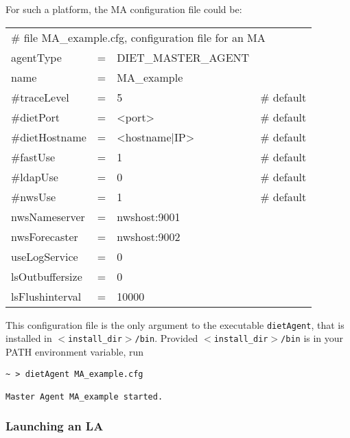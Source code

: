 For such a platform, the MA configuration file could be:
\tt
\begin{center}
 \footnotesize
 \begin{tabular}{lcll}
  \multicolumn{4}{l}{\# file MA\_example.cfg, configuration file for an MA}\\
  agentType     &=&DIET\_MASTER\_AGENT&\\
  name          &=&MA\_example        &\\
  \#traceLevel  &=&5                  &\# default\\
  \#dietPort    &=&<port>             &\# default\\
  \#dietHostname&=&<hostname|IP>      &\# default\\
  \#fastUse     &=&1                  &\# default\\
  \#ldapUse     &=&0                  &\# default\\
  \#nwsUse      &=&1                  &\# default\\
  nwsNameserver &=&nwshost:9001       &\\
  nwsForecaster &=&nwshost:9002       &\\
  useLogService &=& 0                 &\\
  lsOutbuffersize &=& 0               &\\
  lsFlushinterval &=& 10000           &\\
 \end{tabular}
\end{center}
\rm

This configuration file is the only argument to the executable \texttt{dietAgent},
that is installed in \texttt{$<$install\_dir$>$/bin}. Provided
\texttt{$<$install\_dir$>$/bin} is in your PATH environment variable, run
{\footnotesize
\begin{verbatim}
~ > dietAgent MA_example.cfg

Master Agent MA_example started.
\end{verbatim}
}


\subsubsection{Launching an LA}

